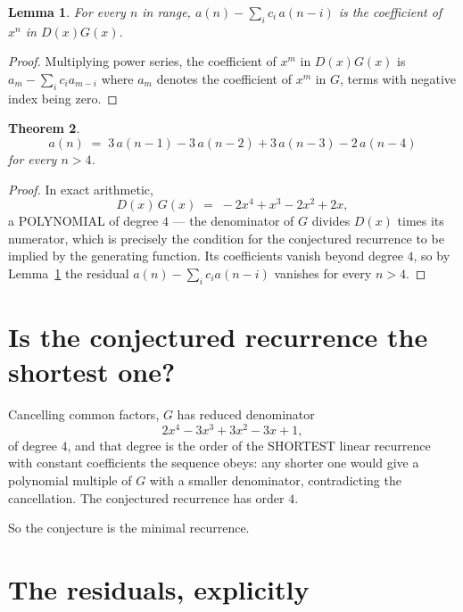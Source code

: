 \documentclass[11pt,a4paper]{article}
\theoremstyle{plain}
\newtheorem{theorem}{Theorem}
\newtheorem{lemma}[theorem]{Lemma}
\theoremstyle{definition}
\begin{document}
\begin{lemma}\label{lem:key}
For every $n$ in range, $a(n)-\sum_i c_i\,a(n-i)$ is the coefficient of $x^{n}$ in
$D(x)G(x)$.
\end{lemma}

\begin{proof}
Multiplying power series, the coefficient of $x^{m}$ in $D(x)G(x)$ is
$a_m-\sum_i c_i a_{m-i}$ where $a_m$ denotes the coefficient of $x^{m}$ in $G$, terms with
negative index being zero.
\end{proof}

\begin{theorem}
\[
a(n)\;=\;3\,a(n-1) - 3\,a(n-2) + 3\,a(n-3) - 2\,a(n-4)
\]
for every $n>4$.
\end{theorem}

\begin{proof}
In exact arithmetic,
\[
D(x)\,G(x)\;=\;- 2 x^{4} + x^{3} - 2 x^{2} + 2 x,
\]
a POLYNOMIAL of degree $4$ --- the denominator of $G$ divides $D(x)$ times its numerator,
which is precisely the condition for the conjectured recurrence to be implied by the
generating function. Its coefficients vanish beyond degree $4$, so by
Lemma~\ref{lem:key} the residual $a(n)-\sum_ic_ia(n-i)$ vanishes for every
$n>4$.
\end{proof}

\section{Is the conjectured recurrence the shortest one?}

Cancelling common factors, $G$ has reduced denominator
\[
2 x^{4} - 3 x^{3} + 3 x^{2} - 3 x + 1,
\]
of degree $4$, and that degree is the order of the SHORTEST linear recurrence with
constant coefficients the sequence obeys: any shorter one would give a polynomial multiple of
$G$ with a smaller denominator, contradicting the cancellation. The conjectured recurrence has
order $4$.

So the conjecture is the minimal recurrence.

\section{The residuals, explicitly}
\end{document}
